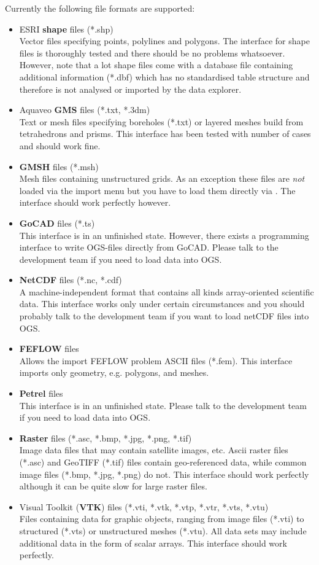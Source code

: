 Currently the following file formats are supported:
\begin{itemize}
\item ESRI \textbf{shape} files (*.shp)\\
Vector files specifying points, polylines and polygons. The interface for shape files is thoroughly tested and there should be no problems whatsoever. However, note that a lot shape files come with a database file containing additional information (*.dbf) which has no standardised table structure and therefore is not analysed or imported by the data explorer.
\item Aquaveo \textbf{GMS} files (*.txt, *.3dm)\\
Text or mesh files specifying boreholes (*.txt) or layered meshes build from tetrahedrons and prisms. This interface has been tested with number of cases and should work fine.
\item \textbf{GMSH} files (*.msh)\\
Mesh files containing unstructured grids. As an exception these files are \emph{not} loaded via the import menu but you have to load them directly via . The interface should work perfectly however.
\item \textbf{GoCAD} files (*.ts)\\
This interface is in an unfinished state. However, there exists a programming interface to write OGS-files directly from GoCAD. Please talk to the development team if you need to load data into OGS.
\item \textbf{NetCDF} files (*.nc, *.cdf)\\
A machine-independent format that contains all kinds array-oriented scientific data. This interface works only under certain circumstances and you should probably talk to the development team if you want to load netCDF files into OGS.
\item \textbf{FEFLOW} files\\
Allows the import FEFLOW problem ASCII files (*.fem). This interface imports only geometry, e.g. polygons, and meshes.
\item \textbf{Petrel} files\\
This interface is in an unfinished state. Please talk to the development team if you need to load data into OGS.
\item \textbf{Raster} files (*.asc, *.bmp, *.jpg, *.png, *.tif)\\
Image data files that may contain satellite images, etc. Ascii raster files (*.asc) and GeoTIFF (*.tif) files contain geo-referenced data, while common image files (*.bmp, *.jpg, *.png) do not. This interface should work perfectly although it can be quite slow for large raster files.
\item Visual Toolkit (\textbf{VTK}) files (*.vti, *.vtk, *.vtp, *.vtr, *.vts, *.vtu)\\
Files containing data for graphic objects, ranging from image files (*.vti) to structured (*.vts) or unstructured meshes (*.vtu). All data sets may include additional data in the form of scalar arrays. This interface should work perfectly.
\end{itemize}

